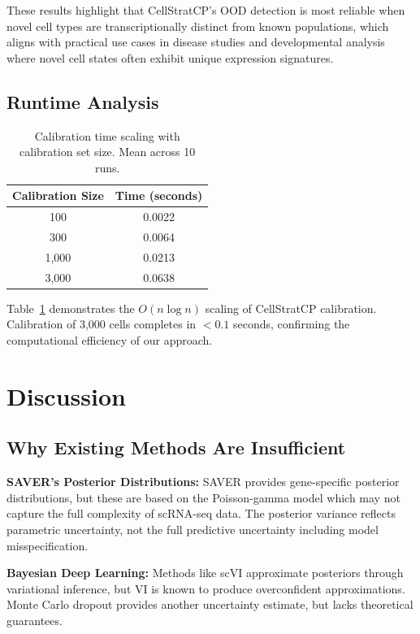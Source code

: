 \documentclass{article}
\begin{document}
These results highlight that CellStratCP's OOD detection is most reliable when novel cell types are transcriptionally distinct from known populations, which aligns with practical use cases in disease studies and developmental analysis where novel cell states often exhibit unique expression signatures.

\subsection{Runtime Analysis}

\begin{table}[t]
\caption{Calibration time scaling with calibration set size. Mean across 10 runs.}
\label{tab:runtime}
\centering
\begin{tabular}{cc}
\toprule
Calibration Size & Time (seconds) \\
\midrule
100 & 0.0022 \\
300 & 0.0064 \\
1,000 & 0.0213 \\
3,000 & 0.0638 \\
\bottomrule
\end{tabular}
\end{table}

Table~\ref{tab:runtime} demonstrates the $O(n \log n)$ scaling of CellStratCP calibration. Calibration of 3,000 cells completes in $<0.1$ seconds, confirming the computational efficiency of our approach.

\section{Discussion}

\subsection{Why Existing Methods Are Insufficient}

\textbf{SAVER's Posterior Distributions:} SAVER provides gene-specific posterior distributions, but these are based on the Poisson-gamma model which may not capture the full complexity of scRNA-seq data. The posterior variance reflects parametric uncertainty, not the full predictive uncertainty including model misspecification.

\textbf{Bayesian Deep Learning:} Methods like scVI approximate posteriors through variational inference, but VI is known to produce overconfident approximations. Monte Carlo dropout provides another uncertainty estimate, but lacks theoretical guarantees.
\end{document}
